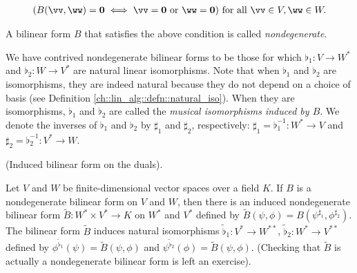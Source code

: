 \begin{defn}
    \begin{align*}
        (B(\vv, \ww) = \mathbf{0} \iff \vv = \mathbf{0} \text{ or } \ww = \mathbf{0}) \text{ for all } \vv \in V, \ww \in W.
    \end{align*}
    
    A bilinear form $B$ that satisfies the above condition is called \textit{nondegenerate}. 
    
    We have contrived nondegenerate bilinear forms to be those for which $\flat_1:V \rightarrow W^{*}$ and $\flat_2:W \rightarrow V^{*}$ are natural linear isomorphisms. Note that when $\flat_1$ and $\flat_2$ are isomorphisms, they are indeed natural because they do not depend on a choice of basis (see Definition \ref{ch::lin_alg::defn::natural_iso}). When they are isomorphisms, $\flat_1$ and $\flat_2$ are called the \textit{musical isomorphisms induced by $B$}. We denote the inverses of $\flat_1$ and $\flat_2$ by $\sharp_1$ and $\sharp_2$, respectively: $\sharp_1 = \flat_1^{-1}:W^* \rightarrow V$ and $\sharp_2 = \flat_2^{-1}:V^* \rightarrow W$.
\end{defn}

\begin{theorem}
\label{ch::bilinear_forms_metric_tensors::induced_bilinear_form_on_duals}
    (Induced bilinear form on the duals).
    
    Let $V$ and $W$ be finite-dimensional vector spaces over a field $K$. If $B$ is a nondegenerate bilinear form on $V$ and $W$, then there is an induced nondegenerate bilinear form $\widetilde{B}:W^* \times V^* \rightarrow K$ on $W^*$ and $V^*$ defined by $\widetilde{B}(\psi, \phi) = B(\psi^{\sharp_1}, \phi^{\sharp_2})$. The bilinear form $\widetilde{B}$ induces natural isomorphisms $\widetilde{\flat}_1:V^* \rightarrow W^{**}$, $\widetilde{\flat}_2:W^* \rightarrow V^{**}$ defined by $\phi^{\widetilde{\flat}_1}(\psi) = \widetilde{B}(\psi, \phi)$ and $\psi^{\widetilde{\flat}_2}(\phi) = \widetilde{B}(\psi, \phi)$. (Checking that $\widetilde{B}$ is actually a nondegenerate bilinear form is left an exercise).
\end{theorem}

